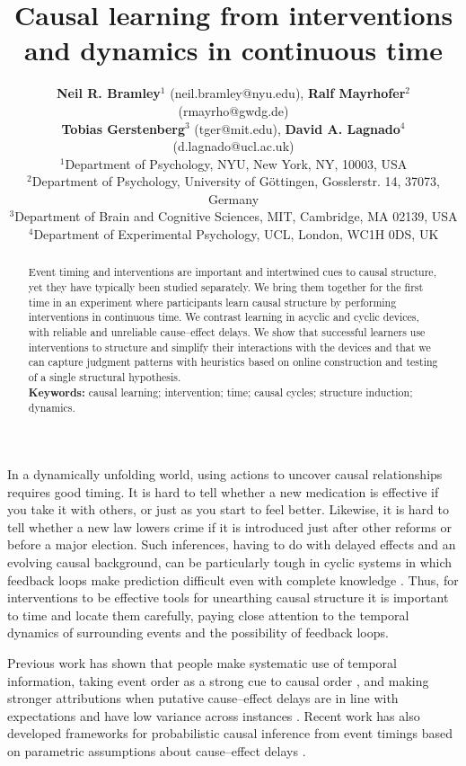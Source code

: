 \documentclass[10pt,letterpaper]{article}
\title{Causal learning from interventions and dynamics in continuous time}
\author{{\large \textbf{Neil R. Bramley$^1$} (neil.bramley@nyu.edu)}, {\large \textbf{Ralf Mayrhofer$^2$} (rmayrho@gwdg.de)}\\{\large \textbf{Tobias Gerstenberg$^3$} (tger@mit.edu), {\large \textbf{David A. Lagnado$^4$} (d.lagnado@ucl.ac.uk)}}\\
{\footnotesize$^1$Department of Psychology, NYU, New York, NY, 10003, USA}\\
{\footnotesize$^2$Department of Psychology, University of G{\"o}ttingen, Gosslerstr. 14, 37073, Germany}\\
{\footnotesize$^3$Department of Brain and Cognitive Sciences, MIT, Cambridge, MA 02139, USA}\\
{\footnotesize$^4$Department of Experimental Psychology, UCL, London, WC1H 0DS, UK}
}
\begin{document}
\maketitle

\begin{abstract}
Event timing and interventions are important and intertwined cues to causal structure, yet they have typically been studied separately.  We bring them together for the first time in an experiment where participants learn causal structure by performing interventions in continuous time.  We contrast learning in acyclic and cyclic devices, with reliable and unreliable cause--effect delays.  We show that successful learners use interventions to structure and simplify their interactions with the devices and that we can capture judgment patterns with heuristics based on online construction and testing of a single structural hypothesis.\\
\textbf{Keywords:} 
causal learning; intervention; time; causal cycles; structure induction; dynamics.
\end{abstract}

In a dynamically unfolding world, using actions to uncover causal relationships requires good timing.  It is hard to tell whether a new medication is effective if you take it with others, or just as you start to feel better.  Likewise, it is hard to tell whether a new law lowers crime if it is introduced just after other reforms or before a major election.  Such inferences, having to do with delayed effects and an evolving causal background, can be particularly tough in cyclic systems in which feedback loops make prediction difficult even with complete knowledge \citep{brehmer1992dynamic}.  Thus, for interventions to be effective tools for unearthing causal structure it is important to time and locate them carefully, paying close attention to the temporal dynamics of surrounding events and the possibility of feedback loops. 

Previous work has shown that people make systematic use of temporal information, taking event order as a strong cue to causal order \citep{bramley2014order}, and making stronger attributions when putative cause--effect delays are in line with expectations \citep{buehner2006temporal} and have low variance across instances \citep{greville2010temporal}. Recent work has also developed frameworks for probabilistic causal inference from event timings based on parametric assumptions about cause--effect delays \citep{bramley2017time,pacer2015upsetting}.
\end{document}
